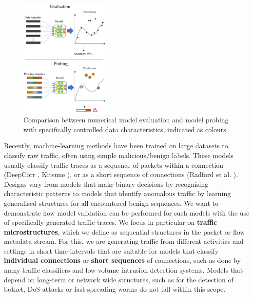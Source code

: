 \documentclass[10pt,conference]{IEEEtran}
\begin{document}
\begin{figure}
\centering
\includegraphics[width=0.4\textwidth]{images/Eva_Prob2.png}
\caption{Comparison between numerical model evaluation and model probing with specifically controlled data characteristics, indicated as colours.}\label{fig:Motiv}
\end{figure}

Recently, machine-learning methods have been trained on large datasets to classify raw traffic, often using simple malicious/benign labels. These models usually classify traffic traces as a sequence of packets within a connection (DeepCorr \cite{nasr2018deepcorr}, Kitsune \cite{mirsky2018kitsune}), or as a short sequence of connections (Radford et al. \cite{radford2018network}). Designs vary from models that make binary decisions by recognising characteristic patterns to models that identify anomalous traffic by learning generalised structures for all encountered benign sequences.
We want to demonstrate how model validation can be performed for such models with the use of specifically generated traffic traces. We focus in particular on \textbf{traffic microstructures}, which we define as sequential structures in the packet or flow metadata stream.
For this, we are generating traffic from different activities and settings in short time-intervals that are suitable for models that classify \textbf{individual connections} or \textbf{short sequences} of connections, such as done by many traffic classifiers and low-volume intrusion detection systems. Models that depend on long-term or network wide structures, such as for the detection of botnet, DoS-attacks or fast-spreading worms do not fall within this scope.

\end{document}
